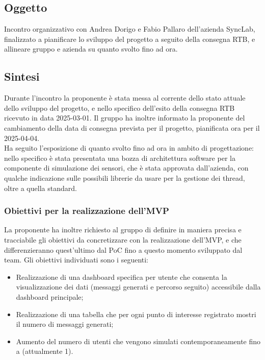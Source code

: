 \documentclass[10pt]{article}
\begin{document}
\subsection{Oggetto}
Incontro organizzativo con Andrea Dorigo e Fabio Pallaro dell'azienda SyncLab, finalizzato a pianificare lo sviluppo del progetto a seguito della consegna RTB, 
e allineare gruppo e azienda su quanto svolto fino ad ora.

\subsection{Sintesi}
Durante l'incontro la proponente è stata messa al corrente dello stato attuale dello sviluppo del progetto, e nello specifico dell'esito della consegna RTB ricevuto in data
2025-03-01. Il gruppo ha inoltre informato la proponente del cambiamento della data di consegna prevista per il progetto, pianificata ora per il 2025-04-04.\\
Ha seguito l'esposizione di quanto svolto fino ad ora in ambito di progettazione: nello specifico è stata presentata una bozza di architettura software per la componente
di simulazione dei sensori, che è stata approvata dall'azienda, con qualche indicazione sulle possibili librerie da usare per la gestione dei thread, oltre a quella 
standard.\\

\subsubsection{Obiettivi per la realizzazione dell'MVP}
La proponente ha inoltre richiesto al gruppo di definire in maniera precisa e tracciabile gli obiettivi da concretizzare con la realizzazione dell'MVP, e che differenzieranno
quest'ultimo dal PoC fino a questo momento sviluppato dal team. Gli obiettivi individuati sono i seguenti:
\begin{itemize}
    \item Realizzazione di una dashboard specifica per utente che consenta la visualizzazione dei dati (messaggi generati e percorso seguito) accessibile dalla dashboard 
    principale;
    \item Realizzazione di una tabella che per ogni punto di interesse registrato mostri il numero di messaggi generati;
    \item Aumento del numero di utenti che vengono simulati contemporaneamente fino a  (attualmente 1).
\end{itemize}
\end{document}
